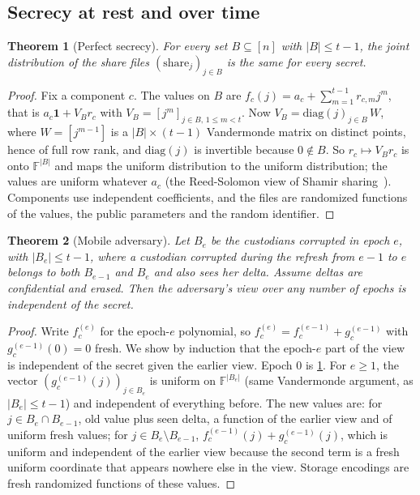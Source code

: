 \documentclass[10.5pt,a4paper]{article}
\theoremstyle{plain}
\newtheorem{theorem}{Theorem}
\theoremstyle{definition}
\newcommand{\F}{\mathbb{F}}
\begin{document}
\subsection{Secrecy at rest and over time}

\begin{theorem}[Perfect secrecy]\label{thm:secrecy}
For every set $B\subseteq[n]$ with $|B|\le t-1$, the joint distribution of the share files $(\text{share}_j)_{j\in B}$ is the same for every secret.
\end{theorem}
\begin{proof}
Fix a component $c$. The values on $B$ are $f_c(j)=a_c+\sum_{m=1}^{t-1}r_{c,m}j^m$, that is $a_c\mathbf 1+V_B r_c$ with $V_B=[j^m]_{j\in B,\,1\le m<t}$. Now $V_B=\mathrm{diag}(j)_{j\in B}\,W$, where $W=[j^{m-1}]$ is a $|B|\times(t-1)$ Vandermonde matrix on distinct points, hence of full row rank, and $\mathrm{diag}(j)$ is invertible because $0\notin B$. So $r_c\mapsto V_Br_c$ is onto $\F^{|B|}$ and maps the uniform distribution to the uniform distribution; the values are uniform whatever $a_c$ (the Reed-Solomon view of Shamir sharing~\cite{mceliece81}). Components use independent coefficients, and the files are randomized functions of the values, the public parameters and the random identifier.
\end{proof}

\begin{theorem}[Mobile adversary]\label{thm:mobile}
Let $B_e$ be the custodians corrupted in epoch $e$, with $|B_e|\le t-1$, where a custodian corrupted during the refresh from $e-1$ to $e$ belongs to both $B_{e-1}$ and $B_e$ and also sees her delta. Assume deltas are confidential and erased. Then the adversary's view over any number of epochs is independent of the secret.
\end{theorem}
\begin{proof}
Write $f^{(e)}_c$ for the epoch-$e$ polynomial, so $f^{(e)}_c=f^{(e-1)}_c+g^{(e-1)}_c$ with $g^{(e-1)}_c(0)=0$ fresh. We show by induction that the epoch-$e$ part of the view is independent of the secret given the earlier view. Epoch 0 is \cref{thm:secrecy}. For $e\ge1$, the vector $(g^{(e-1)}_c(j))_{j\in B_e}$ is uniform on $\F^{|B_e|}$ (same Vandermonde argument, as $|B_e|\le t-1$) and independent of everything before. The new values are: for $j\in B_e\cap B_{e-1}$, old value plus seen delta, a function of the earlier view and of uniform fresh values; for $j\in B_e\setminus B_{e-1}$, $f^{(e-1)}_c(j)+g^{(e-1)}_c(j)$, which is uniform and independent of the earlier view because the second term is a fresh uniform coordinate that appears nowhere else in the view. Storage encodings are fresh randomized functions of these values.
\end{proof}
\end{document}
